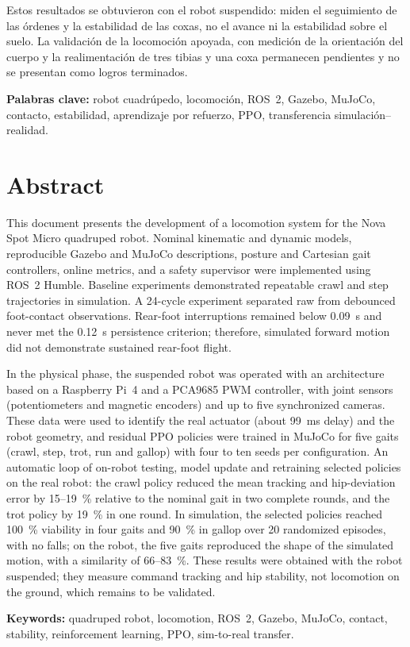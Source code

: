 Estos resultados se obtuvieron con el robot suspendido: miden el seguimiento de
las órdenes y la estabilidad de las coxas, no el avance ni la estabilidad sobre
el suelo. La validación de la locomoción apoyada, con medición de la
orientación del cuerpo y la realimentación de tres tibias y una coxa permanecen pendientes y no se presentan como logros terminados.

\textbf{Palabras clave:} robot cuadrúpedo, locomoción, ROS~2, Gazebo, MuJoCo,
contacto, estabilidad, aprendizaje por refuerzo, PPO, transferencia
simulación--realidad.

\chapter*{Abstract}

This document presents the development of a locomotion system for the Nova
Spot Micro quadruped robot. Nominal kinematic and dynamic models, reproducible
Gazebo and MuJoCo descriptions, posture and Cartesian gait controllers, online
metrics, and a safety supervisor were implemented using ROS~2 Humble. Baseline
experiments demonstrated repeatable crawl and step trajectories in simulation.
A 24-cycle experiment separated raw from debounced foot-contact observations.
Rear-foot interruptions remained below 0.09~s and never met the 0.12~s
persistence criterion; therefore, simulated forward motion did not demonstrate
sustained rear-foot flight.

In the physical phase, the suspended robot was operated with an architecture
based on a Raspberry Pi~4 and a PCA9685 PWM controller, with joint sensors
(potentiometers and magnetic encoders) and up to five synchronized cameras. These data were used
to identify the real actuator (about 99~ms delay) and the robot geometry, and
residual PPO policies were trained in MuJoCo for five gaits (crawl, step, trot, run and
gallop) with four to ten seeds per configuration. An automatic loop of on-robot testing, model
update and retraining selected policies on the real robot: the crawl policy
reduced the mean tracking and hip-deviation error by 15--19~\% relative to the
nominal gait in two complete rounds, and the trot policy by 19~\% in one round.
In simulation, the selected policies reached 100~\% viability in four gaits and 90~\% in
gallop over 20 randomized episodes, with no falls; on the robot, the five gaits
reproduced the shape of the simulated motion, with a similarity of 66--83~\%.
These results were obtained with the robot suspended; they measure command
tracking and hip stability, not locomotion on the ground, which remains to be
validated.

\textbf{Keywords:} quadruped robot, locomotion, ROS~2, Gazebo, MuJoCo,
contact, stability, reinforcement learning, PPO, sim-to-real transfer.

